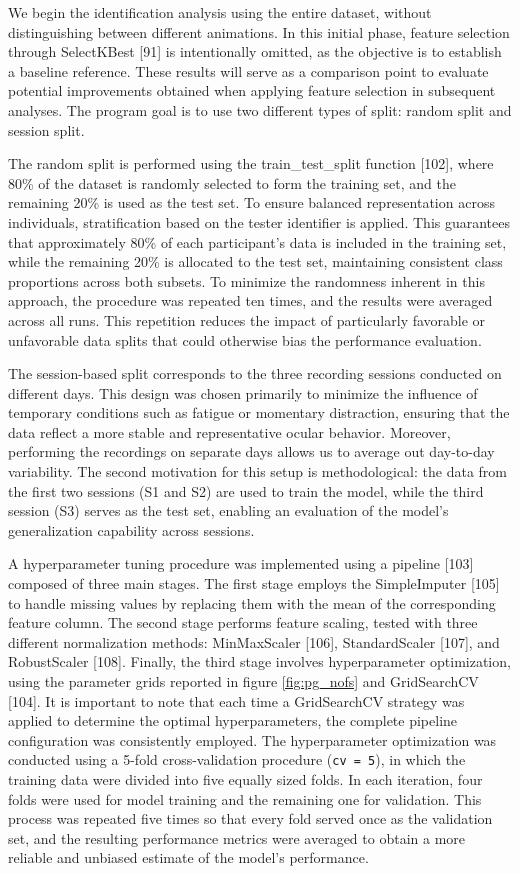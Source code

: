 \documentclass{article}
\begin{document}
We begin the identification analysis using the entire dataset, without distinguishing between different animations.
In this initial phase, feature selection through SelectKBest [91] is intentionally omitted, as the objective is to establish a baseline reference. 
These results will serve as a comparison point to evaluate potential improvements obtained when applying feature selection in subsequent analyses.
The program goal is to use two different types of split: random split and session split.

The random split is performed using the train\_test\_split function [102], where 80\% of the dataset is randomly selected to form the training set, and the remaining 20\% is used as the test set.
To ensure balanced representation across individuals, stratification based on the tester identifier is applied.
This guarantees that approximately 80\% of each participant's data is included in the training set, while the remaining 20\% is allocated to the test set, maintaining consistent class proportions across both subsets.
To minimize the randomness inherent in this approach, the procedure was repeated ten times, and the results were averaged across all runs.
This repetition reduces the impact of particularly favorable or unfavorable data splits that could otherwise bias the performance evaluation.

The session-based split corresponds to the three recording sessions conducted on different days. 
This design was chosen primarily to minimize the influence of temporary conditions such as fatigue or momentary distraction, ensuring that the data reflect a more stable and representative ocular behavior. 
Moreover, performing the recordings on separate days allows us to average out day-to-day variability. 
The second motivation for this setup is methodological: the data from the first two sessions (S1 and S2) are used to train the model, while the third session (S3) serves as the test set, enabling an evaluation of the model's generalization capability across sessions.

A hyperparameter tuning procedure was implemented using a pipeline [103] composed of three main stages.
The first stage employs the SimpleImputer [105] to handle missing values by replacing them with the mean of the corresponding feature column. 
The second stage performs feature scaling, tested with three different normalization methods: MinMaxScaler [106], StandardScaler [107], and RobustScaler [108]. 
Finally, the third stage involves hyperparameter optimization, using the parameter grids reported in figure \ref{fig:pg_nofs} and GridSearchCV [104]. 
It is important to note that each time a GridSearchCV strategy was applied to determine the optimal hyperparameters, the complete pipeline configuration was consistently employed. 
The hyperparameter optimization was conducted using a 5-fold cross-validation procedure (\texttt{cv = 5}), in which the training data were divided into five equally sized folds. 
In each iteration, four folds were used for model training and the remaining one for validation. 
This process was repeated five times so that every fold served once as the validation set, and the resulting performance metrics were averaged to obtain a more reliable and unbiased estimate of the model's performance.
\end{document}
